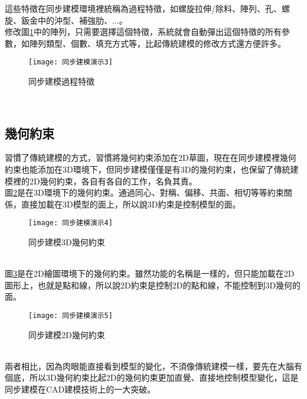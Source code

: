 這些特徵在同步建模環境裡統稱為過程特徵，如螺旋拉伸/除料、陣列、孔、螺旋、鈑金中的沖型、補強肋、...。\\

修改圖\ref{2.81}中的陣列，只需要選擇這個特徵，系統就會自動彈出這個特徵的所有參數，如陣列類型、個數、填充方式等，比起傳統建模的修改方式還方便許多。\\
\begin{figure}[hbt!]
\begin{center}
\texttt{[image: 同步建模演示3]}
\caption{\Large 同步建模過程特徵}\label{2.81}
\end{center}
\end{figure}
\\
\subsection{幾何約束}

習慣了傳統建模的方式，習慣將幾何約束添加在2D草圖，現在在同步建模裡幾何約束也能添加在3D環境下，但同步建模僅僅是有3D的幾何約束，也保留了傳統建模裡的2D幾何約束，各自有各自的工作，名負其責。\\

圖\ref{2.82}是在3D環境下的幾何約束。通過同心、對稱、偏移、共面、相切等等約束關係，直接加載在3D模型的面上，所以說3D約束是控制模型的面。\\
\begin{figure}[hbt!]
\begin{center}
\texttt{[image: 同步建模演示4]}
\caption{\Large 同步建模3D幾何約束}\label{2.82}
\end{center}
\end{figure}
\\
\qquad 圖\ref{2.83}是在2D繪圖環境下的幾何約束。雖然功能的名稱是一樣的，但只能加載在2D圖形上，也就是點和線，所以說2D約束是控制2D的點和線，不能控制到3D幾何的面。\\
\begin{figure}[hbt!]
\begin{center}
\texttt{[image: 同步建模演示5]}
\caption{\Large 同步建模2D幾何約束}\label{2.83}
\end{center}
\end{figure}
\\

\qquad 兩者相比，因為肉眼能直接看到模型的變化，不須像傳統建模一樣，要先在大腦有個底，所以3D幾何約束比起2D的幾何約束更加直覺、直接地控制模型變化，這是同步建模在CAD建模技術上的一大突破。\\

